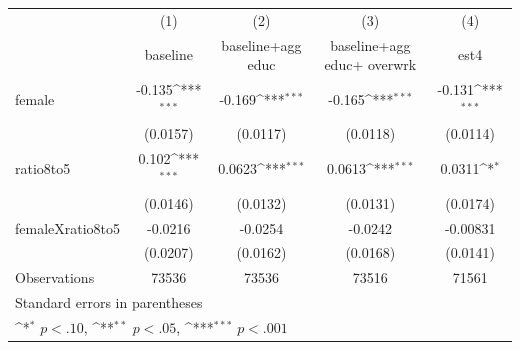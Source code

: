 {
\def\sym#1{\ifmmode^{#1}\else\(^{#1}\)\fi}
\begin{tabular}{l*{4}{c}}
\hline\hline
                    &\multicolumn{1}{c}{(1)}&\multicolumn{1}{c}{(2)}&\multicolumn{1}{c}{(3)}&\multicolumn{1}{c}{(4)}\\
                    &\multicolumn{1}{c}{baseline }&\multicolumn{1}{c}{baseline+agg educ}&\multicolumn{1}{c}{baseline+agg educ+ overwrk}&\multicolumn{1}{c}{est4}\\
\hline
female              &      -0.135\sym{***}&      -0.169\sym{***}&      -0.165\sym{***}&      -0.131\sym{***}\\
                    &    (0.0157)         &    (0.0117)         &    (0.0118)         &    (0.0114)         \\
[1em]
ratio8to5           &       0.102\sym{***}&      0.0623\sym{***}&      0.0613\sym{***}&      0.0311\sym{*}  \\
                    &    (0.0146)         &    (0.0132)         &    (0.0131)         &    (0.0174)         \\
[1em]
femaleXratio8to5    &     -0.0216         &     -0.0254         &     -0.0242         &    -0.00831         \\
                    &    (0.0207)         &    (0.0162)         &    (0.0168)         &    (0.0141)         \\
\hline
Observations        &       73536         &       73536         &       73516         &       71561         \\
\hline\hline
\multicolumn{5}{l}{\footnotesize Standard errors in parentheses}\\
\multicolumn{5}{l}{\footnotesize \sym{*} \(p<.10\), \sym{**} \(p<.05\), \sym{***} \(p<.001\)}\\
\end{tabular}
}
